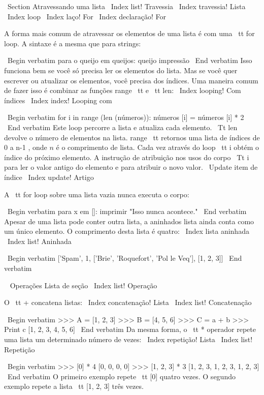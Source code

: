 \documentclass[10pt]{book}
\begin{document}
{{{{{{\ Section {Atravessando uma lista}
\ Index {list! Travessia}
\ Index {travessia! Lista}
\ Index {loop}
\ Index {laço! For}
\ Index {declaração! For}

A forma mais comum de atravessar os elementos de uma lista é
com uma {\ tt for} loop. A sintaxe é a mesma que para strings:

\ Begin {verbatim}
para o queijo em queijos:
    queijo impressão
\ End {verbatim}
%
Isso funciona bem se você só precisa ler os elementos do
lista. Mas se você quer escrever ou atualizar os elementos, você
precisa dos índices. Uma maneira comum de fazer isso é combinar
as funções {range \ tt} e {\ tt len}:
\ Index {looping! Com índices}
\ Index {index! Looping com}

\ Begin {verbatim}
for i in range (len (números)):
    números [i] = números [i] * 2
\ End {verbatim}
%
Este loop percorre a lista e atualiza cada elemento. {\ Tt len}
devolve o número de elementos na lista. {range \ tt} retornos
uma lista de índices de 0 a n-1 $ $, onde $ n $ é o comprimento de
lista. Cada vez através do loop {\ tt i} obtém o índice
do próximo elemento. A instrução de atribuição nos usos do corpo
{\ Tt i} para ler o valor antigo do elemento e para atribuir o
novo valor.
\ {Update} item de índice
\ Index {update! Artigo}

A {\ tt for} loop sobre uma lista vazia nunca executa o corpo:

\ Begin {verbatim}
para x em []:
    imprimir "Isso nunca acontece."
\ End {verbatim}
%
Apesar de uma lista pode conter outra lista, a aninhados
lista ainda conta como um único elemento. O comprimento desta lista é
quatro:
\ Index {lista aninhada}
\ Index {list! Aninhada}

\ Begin {verbatim}
['Spam', 1, ['Brie', 'Roquefort', 'Pol le Veq'], [1, 2, 3]]
\ End {verbatim}



\ {} Operações Lista de seção
\ Index {list! Operação}

O {\ tt +} concatena listas:
\ Index {concatenação! Lista}
\ Index {list! Concatenação}

\ Begin {verbatim}
>>> A = [1, 2, 3]
>>> B = [4, 5, 6]
>>> C = a + b
>>> Print c
[1, 2, 3, 4, 5, 6]
\ End {verbatim}
%
Da mesma forma, o {\ tt *} operador repete uma lista um determinado número de vezes:
\ Index {repetição! Lista}
\ Index {list! Repetição}

\ Begin {verbatim}
>>> [0] * 4
[0, 0, 0, 0]
>>> [1, 2, 3] * 3
[1, 2, 3, 1, 2, 3, 1, 2, 3]
\ End {verbatim}
%
O primeiro exemplo repete {\ tt [0]} quatro vezes. O segundo exemplo
repete a lista {\ tt [1, 2, 3]} três vezes.


}}}}}}
\end{document}
